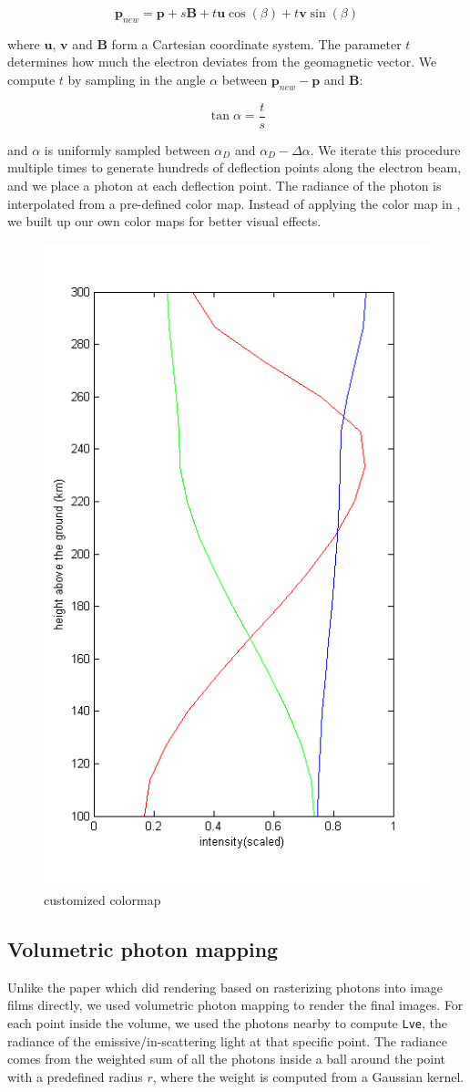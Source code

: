 \documentclass[10pt,a4paper]{article}
\begin{document}
\[
\mathbf{p}_{new} = \mathbf{p} + s\mathbf{B} + t\mathbf{u}\cos(\beta) + t\mathbf{v}\sin(\beta)
\]

where $\mathbf{u}$, $\mathbf{v}$ and $\mathbf{B}$ form a Cartesian coordinate system. The parameter $t$ determines how much the electron deviates from the geomagnetic vector. We compute $t$ by sampling in the angle $\alpha$ between $\mathbf{p}_{new} - \mathbf{p}$ and $\mathbf{B}$:

\[
\tan{\alpha} = \frac{t}{s}
\]

and $\alpha$ is uniformly sampled between $\alpha_D$ and $\alpha_D - \Delta \alpha$. We iterate this procedure multiple times to generate hundreds of deflection points along the electron beam, and we place a photon at each deflection point. The radiance of the photon is interpolated from a pre-defined color map. Instead of applying the color map in \cite{baranoski2000simulating}, we built up our own color maps for better visual effects.

\begin{figure}[h]
\centering
\includegraphics[width=0.5\linewidth]{./colormap}
\caption{customized colormap}
\label{fig:colormap}
\end{figure}

\subsection{Volumetric photon mapping}

Unlike the paper \cite{baranoski2000simulating} which did rendering based on rasterizing photons into image films directly, we used volumetric photon mapping to render the final images. For each point inside the volume, we used the photons nearby to compute \texttt{Lve}, the radiance of the emissive/in-scattering light at that specific point. The radiance comes from the weighted sum of all the photons inside a ball around the point with a predefined radius $r$, where the weight is computed from a Gaussian kernel.
\end{document}
